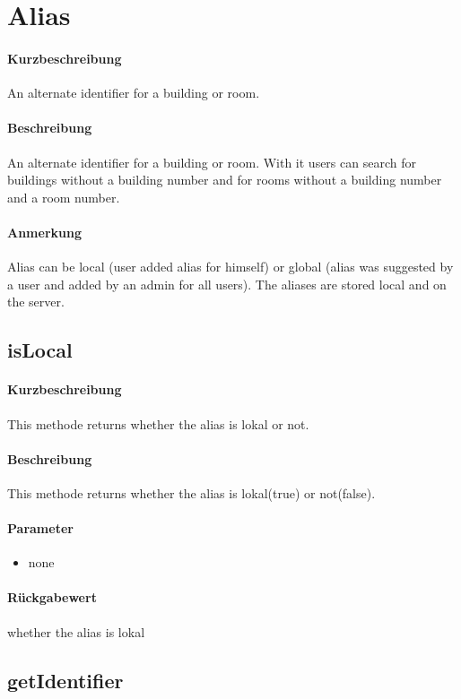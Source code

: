 \section{Alias}
\paragraph*{Kurzbeschreibung}
An alternate identifier for a building or room.
\paragraph*{Beschreibung}
An alternate identifier for a building or room. 
With it users can search for buildings without a building number and for rooms without a building number and a room number.
\paragraph*{Anmerkung}
Alias can be local (user added alias for himself) or global (alias was suggested by a user and added by an admin for all users).
The aliases are stored local and on the server.

\subsection{isLocal}%
\paragraph*{Kurzbeschreibung}
This methode returns whether the alias is lokal or not.
\paragraph*{Beschreibung}
This methode returns whether the alias is lokal(true) or not(false).
\paragraph*{Parameter}
\begin{itemize}
    \item none
\end{itemize}
\paragraph*{Rückgabewert}
whether the alias is lokal

\subsection{getIdentifier}%
